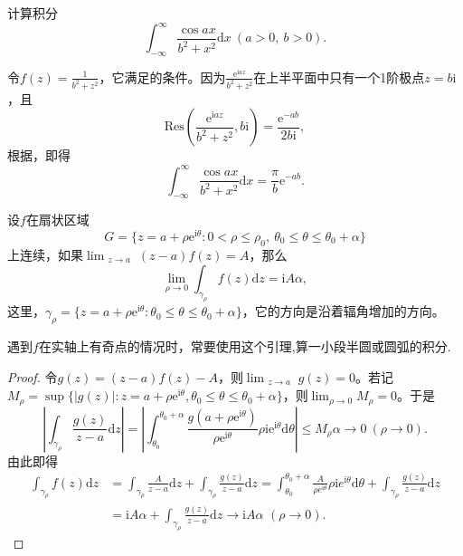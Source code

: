 \documentclass[../../main.tex]{subfiles}%
\begin{document}
\begin{example}
计算积分
\[
\int_{-\infty}^{\infty} \frac{\cos ax}{b^2 + x^2} \mathrm{d}x \ (a > 0, \ b > 0).
\]
\end{example}
\begin{solution}

令\( f(z) = \frac{1}{b^2 + z^2} \)，它满足的条件。因为\( \frac{\mathrm{e}^{\mathrm{i}az}}{b^2 + z^2} \)在上半平面中只有一个1阶极点\( z = b\mathrm{i} \)，且
\[
\mathrm{Res}\left( \frac{\mathrm{e}^{\mathrm{i}az}}{b^2 + z^2}, b\mathrm{i} \right) = \frac{\mathrm{e}^{-ab}}{2b\mathrm{i}},
\]
根据，即得
\[
\int_{-\infty}^{\infty} \frac{\cos ax}{b^2 + x^2} \mathrm{d}x = \frac{\pi}{b} \mathrm{e}^{-ab}.
\]

\end{solution}

\begin{lemma}\label{lemma:引理5.5.9}
设$f$在扇状区域
\[
G = \{ z = a + \rho \mathrm{e}^{\mathrm{i}\theta} : 0 < \rho \leqslant \rho_0, \ \theta_0 \leqslant \theta \leqslant \theta_0 + \alpha \}
\]
上连续，如果\(\lim_{\substack{z \to a}} (z - a)f(z) = A\)，那么
\[
\lim_{\rho \to 0} \int_{\gamma_{\rho}} f(z) \mathrm{d}z = \mathrm{i}A\alpha, \label{lem5.5.9_eq}
\]
这里，\(\gamma_{\rho} = \{ z = a + \rho \mathrm{e}^{\mathrm{i}\theta} : \theta_0 \leqslant \theta \leqslant \theta_0 + \alpha \}\)，它的方向是沿着辐角增加的方向。
\end{lemma}
\begin{remark}
遇到$f$在实轴上有奇点的情况时，常要使用这个引理,算一小段半圆或圆弧的积分.
\end{remark}
\begin{proof}

令\( g(z) = (z - a)f(z) - A \)，则\(\lim_{\substack{z \to a}} g(z) = 0\)。若记\( M_{\rho} = \sup\{ |g(z)| : z = a + \rho \mathrm{e}^{\mathrm{i}\theta}, \theta_0 \leqslant \theta \leqslant \theta_0 + \alpha \} \)，则\(\lim_{\rho \to 0} M_{\rho} = 0\)。于是
\[
\left| \int_{\gamma_{\rho}} \frac{g(z)}{z - a} \mathrm{d}z \right| = \left| \int_{\theta_0}^{\theta_0 + \alpha} \frac{g(a + \rho \mathrm{e}^{\mathrm{i}\theta})}{\rho \mathrm{e}^{\mathrm{i}\theta}} \rho \mathrm{i}\mathrm{e}^{\mathrm{i}\theta} \mathrm{d}\theta \right|
\leqslant M_{\rho}\alpha
\to 0 \ (\rho \to 0).
\]
由此即得
\begin{align*}
\int_{\gamma _{\rho}}{f(z)\mathrm{d}z}&=\int_{\gamma _{\rho}}{\frac{A}{z-a}\mathrm{d}z}+\int_{\gamma _{\rho}}{\frac{g(z)}{z-a}\mathrm{d}z}=\int_{\theta _0}^{\theta _0+\alpha}{\frac{A}{\rho e^{\mathrm{i}\theta}}\rho \mathrm{i}e^{\mathrm{i}\theta}\mathrm{d}\theta}+\int_{\gamma _{\rho}}{\frac{g(z)}{z-a}\mathrm{d}z}
\\
&=\mathrm{i}A\alpha +\int_{\gamma _{\rho}}{\frac{g(z)}{z-a}\mathrm{d}z}\rightarrow \mathrm{i}A\alpha \,\,(\rho \rightarrow 0).
\end{align*}

\end{proof}
\end{document}
